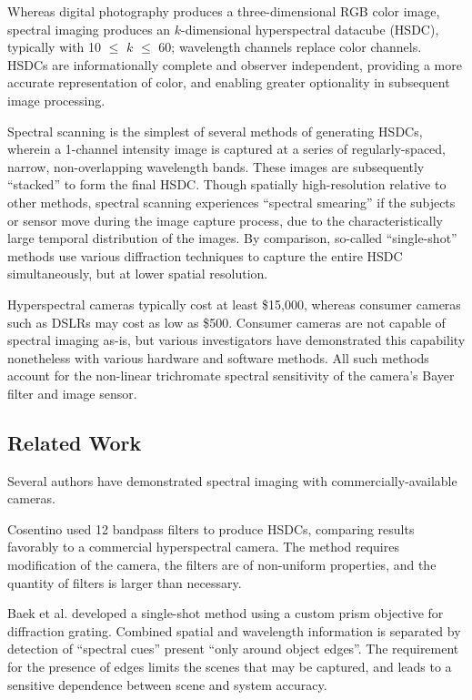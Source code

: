 \documentclass[twocolumn,10pt]{asme2ej}
\newcommand{\id}{\hspace{6 mm}}
\begin{document}

\id Whereas digital photography produces a three-dimensional RGB color image, spectral imaging produces an $k$-dimensional hyperspectral datacube (HSDC), typically with 10 $\leq$ $k$ $\leq$ 60; wavelength channels replace color channels. HSDCs are informationally complete and observer independent, providing a more accurate representation of color, and enabling greater optionality in subsequent image processing.


\id Spectral scanning is the simplest of several methods of generating HSDCs, wherein a 1-channel intensity image is captured at a series of regularly-spaced, narrow, non-overlapping wavelength bands. These images are subsequently ``stacked'' to form the final HSDC. Though spatially high-resolution relative to other methods, spectral scanning experiences ``spectral smearing'' if the subjects or sensor move during the image capture process, due to the characteristically large temporal distribution of the images. By comparison, so-called ``single-shot'' methods use various diffraction techniques to capture the entire HSDC simultaneously, but at lower spatial resolution.


\id Hyperspectral cameras typically cost at least \$15,000, whereas consumer cameras such as DSLRs may cost as low as \$500. Consumer cameras are not capable of spectral imaging as-is, but various investigators have demonstrated this capability nonetheless with various hardware and software methods. All such methods account for the non-linear trichromate spectral sensitivity of the camera's Bayer filter and image sensor.

\subsection{Related Work}

Several authors have demonstrated spectral imaging with commercially-available cameras.

\id Cosentino \cite{Cosentino} used 12 bandpass filters to produce HSDCs, comparing results favorably to a commercial hyperspectral camera. The method requires modification of the camera, the filters are of non-uniform properties, and the quantity of filters is larger than necessary.

\id Baek et al. \cite{Baek} developed a single-shot method using a custom prism objective for diffraction grating. Combined spatial and wavelength information is separated by detection of ``spectral cues'' present ``only around object edges''. The requirement for the presence of edges limits the scenes that may be captured, and leads to a sensitive dependence between scene and system accuracy.
\end{document}

